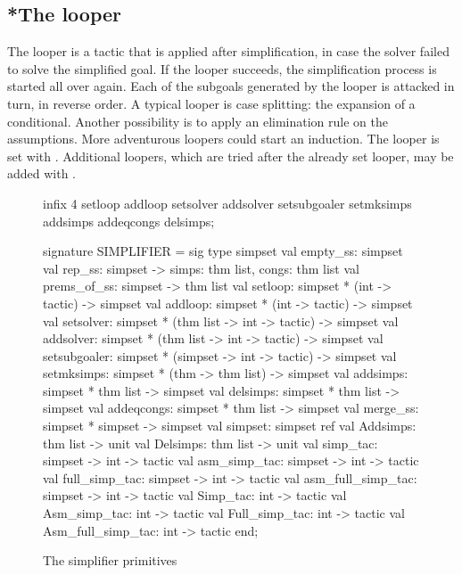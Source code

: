 \subsection{*The looper}
The looper is a tactic that is applied after simplification, in case the
solver failed to solve the simplified goal.  If the looper succeeds, the
simplification process is started all over again.  Each of the subgoals
generated by the looper is attacked in turn, in reverse order.  A
typical looper is case splitting: the expansion of a conditional.  Another
possibility is to apply an elimination rule on the assumptions.  More
adventurous loopers could start an induction.  The looper is set with 
. Additional loopers, which are tried after the already set
looper, may be added with .


\begin{figure}

\begin{ttbox}
infix 4 setloop addloop setsolver addsolver 
        setsubgoaler setmksimps
        addsimps addeqcongs delsimps;

signature SIMPLIFIER =
sig
  type simpset
  val empty_ss: simpset
  val rep_ss: simpset -> {simps: thm list, congs: thm list}
  val prems_of_ss: simpset -> thm list
  val setloop: simpset * (int -> tactic) -> simpset
  val addloop: simpset * (int -> tactic) -> simpset
  val setsolver: simpset * (thm list -> int -> tactic) -> simpset
  val addsolver: simpset * (thm list -> int -> tactic) -> simpset
  val setsubgoaler: simpset * (simpset -> int -> tactic) -> simpset
  val setmksimps: simpset * (thm -> thm list) -> simpset
  val addsimps: simpset * thm list -> simpset
  val delsimps: simpset * thm list -> simpset
  val addeqcongs: simpset * thm list -> simpset
  val merge_ss: simpset * simpset -> simpset
  val simpset: simpset ref
  val Addsimps: thm list -> unit
  val Delsimps: thm list -> unit
  val          simp_tac: simpset -> int -> tactic
  val      asm_simp_tac: simpset -> int -> tactic
  val     full_simp_tac: simpset -> int -> tactic
  val asm_full_simp_tac: simpset -> int -> tactic
  val          Simp_tac: int -> tactic
  val      Asm_simp_tac: int -> tactic
  val     Full_simp_tac: int -> tactic
  val Asm_full_simp_tac: int -> tactic
end;
\end{ttbox}
\caption{The simplifier primitives} \label{SIMPLIFIER}
\end{figure}


